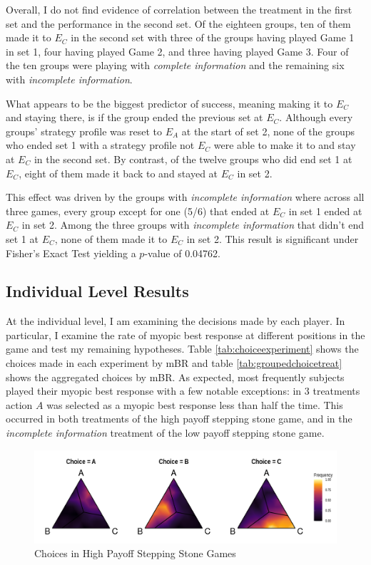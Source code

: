 Overall, I do not find evidence of correlation between the treatment in the first set and the performance in the second set. Of the eighteen groups, ten of them made it to $E_C$ in the second set with three of the groups having played Game 1 in set 1, four having played Game 2, and three having played Game 3. Four of the ten groups were playing with \textit{complete information} and the remaining six with \textit{incomplete information}. 

What appears to be the biggest predictor of success, meaning making it to $E_C$ and staying there, is if the group ended the previous set at $E_C$. Although every groups' strategy profile was reset to $E_A$ at the start of set 2, none of the groups who ended set 1 with a strategy profile not $E_C$ were able to make it to and stay at $E_C$ in the second set. By contrast, of the twelve groups who did end set 1 at $E_C$, eight of them made it back to and stayed at $E_C$ in set 2.

This effect was driven by the groups with \textit{incomplete information} where across all three games, every group except for one (5/6) that ended at $E_C$ in set 1 ended at $E_C$ in set 2. Among the three groups with \textit{incomplete information} that didn't end set 1 at $E_C$, none of them made it to $E_C$ in set 2. This result is significant under Fisher's Exact Test yielding a $p$-value of 0.04762.


\subsection{Individual Level Results}

At the individual level, I am examining the decisions made by each player. In particular, I examine the rate of myopic best response at different positions in the game and test my remaining hypotheses. Table \ref{tab:choiceexperiment} shows the choices made in each experiment by mBR and table \ref{tab:groupedchoicetreat} shows the aggregated choices by mBR. As expected, most frequently subjects played their myopic best response with a few notable exceptions: in 3 treatments action $A$ was selected as a myopic best response less than half the time. This occurred in both treatments of the high payoff stepping stone game, and in the \textit{incomplete information} treatment of the low payoff stepping stone game. 


\begin{figure}[h]
\captionsetup{justification=centering}
  \caption[caption]{Choices in High Payoff Stepping Stone Games}
   \label{fig:Game2ChoiceFreq}
    \includegraphics[width = \textwidth]{Images/Game2ChoiceFreq.png}
\end{figure}

